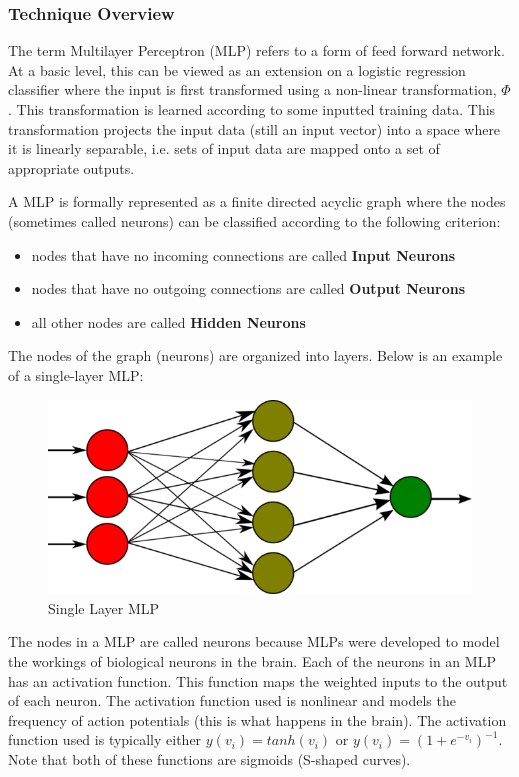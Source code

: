 \documentclass{article}
\begin{document}
  \subsubsection{Technique Overview}
  
  The term Multilayer Perceptron (MLP) refers to a form of feed forward network. At a basic level, this can be viewed
  as an extension on a logistic regression classifier where the input is first transformed using a non-linear 
  transformation, $\Phi$. This transformation is learned according to some inputted training data. This transformation
  projects the input data (still an input vector) into a space where it is linearly separable, i.e. sets of input data are
  mapped onto a set of appropriate outputs.
  
  A MLP is formally represented as a finite directed acyclic graph where the nodes (sometimes called neurons) can be
  classified according to the following criterion:
  \begin{itemize}
    \item nodes that have no incoming connections are called \textbf{Input Neurons}
    \item nodes that have no outgoing connections are called \textbf{Output Neurons}
    \item all other nodes are called \textbf{Hidden Neurons}
  \end{itemize}
  The nodes of the graph (neurons) are organized into layers. Below is an example of a single-layer MLP:
  \FloatBarrier
  \begin{figure}[h]
    \caption{Single Layer MLP}
    \centering
    \includegraphics[scale=0.3]{images/single_layer_mlp_example}
  \end{figure}
  \FloatBarrier
  
  The nodes in a MLP are called neurons because MLPs were developed to model the workings of biological neurons in the
  brain. Each of the neurons in an MLP has an activation function. This function maps the weighted inputs to the output of
  each neuron. The activation function used is nonlinear and models the frequency of action potentials (this is what happens
  in the brain). The activation function used is typically either $y(v_{i}) = tanh(v_{i})$ or $y(v_{i}) = (1 + e^{-v_{i}})^{-1}$.
  Note that both of these functions are sigmoids (S-shaped curves).
  
\end{document}
